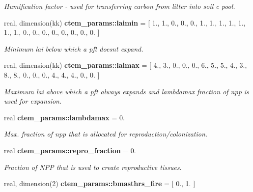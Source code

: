 \begin{DoxyCompactItemize}
\begin{DoxyCompactList}\small\item\em Humification factor -\/ used for transferring carbon from litter into soil c pool. \end{DoxyCompactList}\item 
\hypertarget{namespacectem__params_a7a661dffd51da0f6b8c71a0f71fd2679}{}real, dimension(kk) {\bfseries ctem\+\_\+params\+::laimin} = \mbox{[} 1., 1., 0., 0., 0., 1., 1., 1., 1., 1., 1., 1., 0., 0., 0., 0., 0., 0., 0., 0. \mbox{]}\label{namespacectem__params_a7a661dffd51da0f6b8c71a0f71fd2679}

\begin{DoxyCompactList}\small\item\em Minimum lai below which a pft doesn\textquotesingle{}t expand. \end{DoxyCompactList}\item 
\hypertarget{namespacectem__params_abec8d35477e7996256f26318e666f199}{}real, dimension(kk) {\bfseries ctem\+\_\+params\+::laimax} = \mbox{[} 4., 3., 0., 0., 0., 6., 5., 5., 4., 3., 8., 8., 0., 0., 0., 4., 4., 4., 0., 0. \mbox{]}\label{namespacectem__params_abec8d35477e7996256f26318e666f199}

\begin{DoxyCompactList}\small\item\em Maximum lai above which a pft always expands and lambdamax fraction of npp is used for expansion. \end{DoxyCompactList}\item 
\hypertarget{namespacectem__params_ae7cc598974253bc2df0aeaed4ffea891}{}real {\bfseries ctem\+\_\+params\+::lambdamax} = 0.\label{namespacectem__params_ae7cc598974253bc2df0aeaed4ffea891}

\begin{DoxyCompactList}\small\item\em Max. fraction of npp that is allocated for reproduction/colonization. \end{DoxyCompactList}\item 
\hypertarget{namespacectem__params_a4b02c06a75e1eba7cae5f864b099bb0d}{}real {\bfseries ctem\+\_\+params\+::repro\+\_\+fraction} = 0.\label{namespacectem__params_a4b02c06a75e1eba7cae5f864b099bb0d}

\begin{DoxyCompactList}\small\item\em Fraction of N\+P\+P that is used to create reproductive tissues. \end{DoxyCompactList}\item 
\hypertarget{namespacectem__params_a62e7197e6f7c9c31dc86998dc8c9ebf2}{}real, dimension(2) {\bfseries ctem\+\_\+params\+::bmasthrs\+\_\+fire} = \mbox{[} 0., 1. \mbox{]}\label{namespacectem__params_a62e7197e6f7c9c31dc86998dc8c9ebf2}


\end{DoxyCompactItemize}
